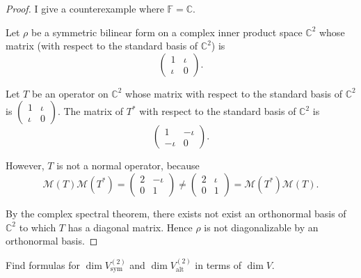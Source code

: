 \begin{proof}
    I give a counterexample where $\mathbb{F} = \mathbb{C}$.

    Let $\rho$ be a symmetric bilinear form on a complex inner product space $\mathbb{C}^{2}$ whose matrix (with respect to the standard basis of $\mathbb{C}^{2}$) is
    \[
        \begin{pmatrix}
            1     & \iota \\
            \iota & 0
        \end{pmatrix}.
    \]

    Let $T$ be an operator on $\mathbb{C}^{2}$ whose matrix with respect to the standard basis of $\mathbb{C}^{2}$ is $\begin{pmatrix}1 & \iota \\ \iota & 0 \end{pmatrix}$. The matrix of $T^{*}$ with respect to the standard basis of $\mathbb{C}^{2}$ is
    \[
        \begin{pmatrix}
            1      & -\iota \\
            -\iota & 0
        \end{pmatrix}.
    \]

    However, $T$ is not a normal operator, because
    \[
        \mathcal{M}(T)\mathcal{M}(T^{*}) =
        \begin{pmatrix}
            2 & -\iota \\
            0 & 1
        \end{pmatrix} \ne
        \begin{pmatrix}
            2 & \iota \\
            0 & 1
        \end{pmatrix} = \mathcal{M}(T^{*})\mathcal{M}(T).
    \]

    By the complex spectral theorem, there exists not exist an orthonormal basis of $\mathbb{C}^{2}$ to which $T$ has a diagonal matrix. Hence $\rho$ is not diagonalizable by an orthonormal basis.
\end{proof}
\newpage

\begin{exercise}\label{chapter9:sectionA:exercise8}
    Find formulas for $\dim V_{\text{sym}}^{(2)}$ and $\dim V_{\text{alt}}^{(2)}$ in terms of $\dim V$.
\end{exercise}


